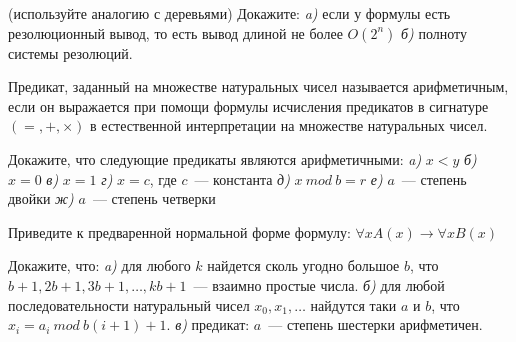 \setcounter{curtask}{7}


\begin{task} (используйте аналогию с деревьями)
    Докажите: {\it a)} если у формулы есть резолюционный вывод, то
    есть вывод длиной не более $O(2^n)$ {\it б)} полноту системы
    резолюций.
\end{task}

Предикат, заданный на множестве натуральных чисел называется
арифметичным, если он выражается при помощи формулы исчисления
предикатов в сигнатуре $(=, +, \times)$ в естественной интерпретации
на множестве натуральных чисел.

\begin{task}
    Докажите, что следующие предикаты являются арифметичными:
    {\it a)} $x < y$
    {\it б)} $x = 0$
    {\it в)} $x = 1$
    {\it г)} $x = c$, где $c$~--- константа
    {\it д)} $x~mod~b = r$
    {\it е)} $a$~--- степень двойки
    {\it ж)} $a$~--- степень четверки
\end{task}

\begin{task}
    Приведите к предваренной нормальной форме формулу:
    $\forall x A(x) \rightarrow \forall x B(x)$
\end{task}

\begin{task}
    Докажите, что:
    {\it a)} для любого $k$ найдется сколь угодно большое $b$, что
    $b + 1, 2b + 1, 3b + 1, \dots, kb + 1$~--- взаимно простые числа.
    {\it б)} для любой последовательности натуральный чисел $x_0, x_1,
    \dots$ найдутся таки $a$ и $b$, что $x_i = a_i~ mod ~ b(i + 1) +
    1$.
    {\it в)} предикат: $a$~--- степень шестерки арифметичен.
\end{task}